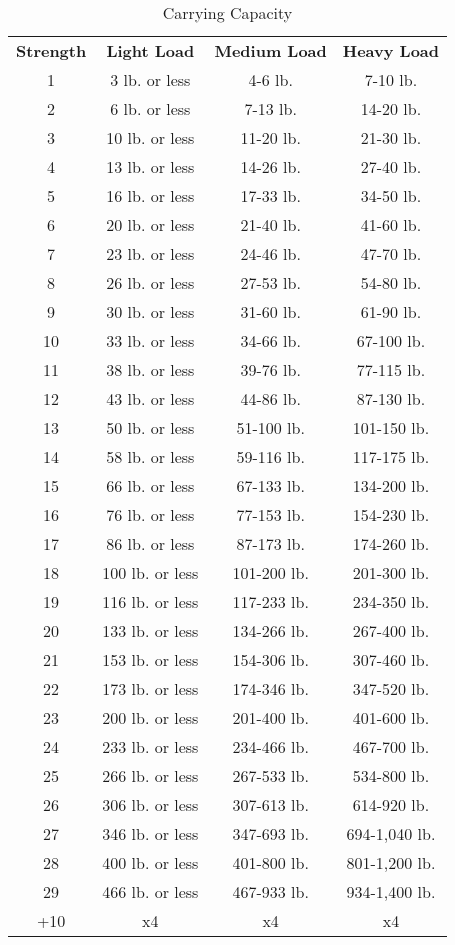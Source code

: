 \begin{table}[htb]
\caption{Carrying Capacity}
\centering
\begin{tabular}{c c c c}
\textbf{Strength} & \textbf{Light Load} & \textbf{Medium Load} & \textbf{Heavy Load}\\
1 & 3 lb. or less & 4-6 lb. & 7-10 lb.\\
2 & 6 lb. or less & 7-13 lb. & 14-20 lb.\\
3 & 10 lb. or less & 11-20 lb. & 21-30 lb.\\
4 & 13 lb. or less & 14-26 lb. & 27-40 lb.\\
5 & 16 lb. or less & 17-33 lb. & 34-50 lb.\\
6 & 20 lb. or less & 21-40 lb. & 41-60 lb.\\
7 & 23 lb. or less & 24-46 lb. & 47-70 lb.\\
8 & 26 lb. or less & 27-53 lb. & 54-80 lb.\\
9 & 30 lb. or less & 31-60 lb. & 61-90 lb.\\
10 & 33 lb. or less & 34-66 lb. & 67-100 lb.\\
11 & 38 lb. or less & 39-76 lb. & 77-115 lb.\\
12 & 43 lb. or less & 44-86 lb. & 87-130 lb.\\
13 & 50 lb. or less & 51-100 lb. & 101-150 lb.\\
14 & 58 lb. or less & 59-116 lb. & 117-175 lb.\\
15 & 66 lb. or less & 67-133 lb. & 134-200 lb.\\
16 & 76 lb. or less & 77-153 lb. & 154-230 lb.\\
17 & 86 lb. or less & 87-173 lb. & 174-260 lb.\\
18 & 100 lb. or less & 101-200 lb. & 201-300 lb.\\
19 & 116 lb. or less & 117-233 lb. & 234-350 lb.\\
20 & 133 lb. or less & 134-266 lb. & 267-400 lb.\\
21 & 153 lb. or less & 154-306 lb. & 307-460 lb.\\
22 & 173 lb. or less & 174-346 lb. & 347-520 lb.\\
23 & 200 lb. or less & 201-400 lb. & 401-600 lb.\\
24 & 233 lb. or less & 234-466 lb. & 467-700 lb.\\
25 & 266 lb. or less & 267-533 lb. & 534-800 lb.\\
26 & 306 lb. or less & 307-613 lb. & 614-920 lb.\\
27 & 346 lb. or less & 347-693 lb. & 694-1,040 lb.\\
28 & 400 lb. or less & 401-800 lb. & 801-1,200 lb.\\
29 & 466 lb. or less & 467-933 lb. & 934-1,400 lb.\\
+10 & x4 & x4 & x4\\
\end{tabular}
\end{table}

